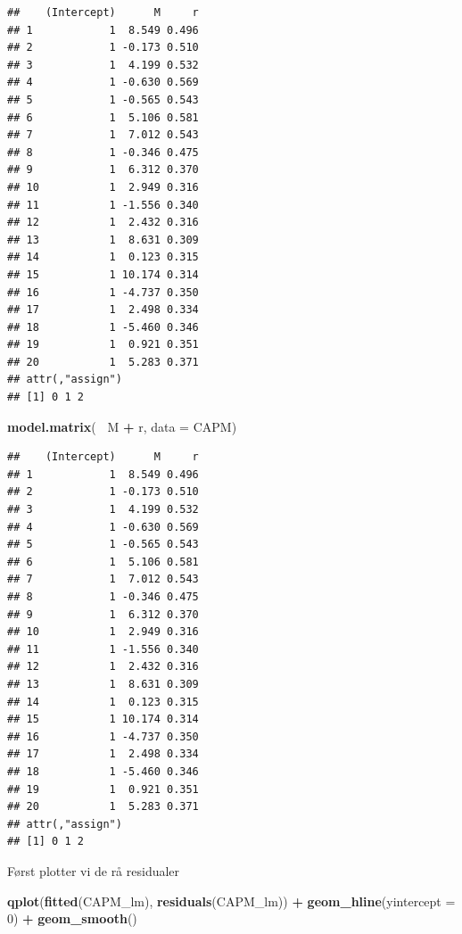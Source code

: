 \documentclass[
]{article}
\newenvironment{Shaded}{\begin{snugshade}}{\end{snugshade}}
\newcommand{\DataTypeTok}[1]{\textcolor[rgb]{0.13,0.29,0.53}{#1}}
\newcommand{\DecValTok}[1]{\textcolor[rgb]{0.00,0.00,0.81}{#1}}
\newcommand{\KeywordTok}[1]{\textcolor[rgb]{0.13,0.29,0.53}{\textbf{#1}}}
\newcommand{\NormalTok}[1]{#1}
\newcommand{\OperatorTok}[1]{\textcolor[rgb]{0.81,0.36,0.00}{\textbf{#1}}}
\newcommand{\StringTok}[1]{\textcolor[rgb]{0.31,0.60,0.02}{#1}}
\begin{document}
\begin{verbatim}
##    (Intercept)      M     r
## 1            1  8.549 0.496
## 2            1 -0.173 0.510
## 3            1  4.199 0.532
## 4            1 -0.630 0.569
## 5            1 -0.565 0.543
## 6            1  5.106 0.581
## 7            1  7.012 0.543
## 8            1 -0.346 0.475
## 9            1  6.312 0.370
## 10           1  2.949 0.316
## 11           1 -1.556 0.340
## 12           1  2.432 0.316
## 13           1  8.631 0.309
## 14           1  0.123 0.315
## 15           1 10.174 0.314
## 16           1 -4.737 0.350
## 17           1  2.498 0.334
## 18           1 -5.460 0.346
## 19           1  0.921 0.351
## 20           1  5.283 0.371
## attr(,"assign")
## [1] 0 1 2
\end{verbatim}

\begin{Shaded}
\begin{Highlighting}[]
\KeywordTok{model.matrix}\NormalTok{(}\OperatorTok{~}\StringTok{ }\NormalTok{M }\OperatorTok{+}\StringTok{ }\NormalTok{r, }\DataTypeTok{data =}\NormalTok{ CAPM)}
\end{Highlighting}
\end{Shaded}

\begin{verbatim}
##    (Intercept)      M     r
## 1            1  8.549 0.496
## 2            1 -0.173 0.510
## 3            1  4.199 0.532
## 4            1 -0.630 0.569
## 5            1 -0.565 0.543
## 6            1  5.106 0.581
## 7            1  7.012 0.543
## 8            1 -0.346 0.475
## 9            1  6.312 0.370
## 10           1  2.949 0.316
## 11           1 -1.556 0.340
## 12           1  2.432 0.316
## 13           1  8.631 0.309
## 14           1  0.123 0.315
## 15           1 10.174 0.314
## 16           1 -4.737 0.350
## 17           1  2.498 0.334
## 18           1 -5.460 0.346
## 19           1  0.921 0.351
## 20           1  5.283 0.371
## attr(,"assign")
## [1] 0 1 2
\end{verbatim}

Først plotter vi de rå residualer

\begin{Shaded}
\begin{Highlighting}[]
\KeywordTok{qplot}\NormalTok{(}\KeywordTok{fitted}\NormalTok{(CAPM_lm), }\KeywordTok{residuals}\NormalTok{(CAPM_lm)) }\OperatorTok{+}\StringTok{ }
\StringTok{    }\KeywordTok{geom_hline}\NormalTok{(}\DataTypeTok{yintercept =} \DecValTok{0}\NormalTok{) }\OperatorTok{+}
\StringTok{    }\KeywordTok{geom_smooth}\NormalTok{()}
\end{Highlighting}
\end{Shaded}
\end{document}
